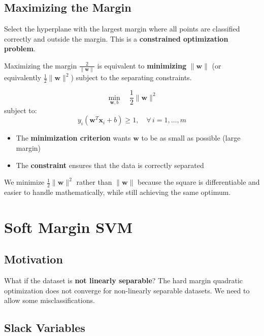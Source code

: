 \documentclass[11pt,a4paper]{article}
\theoremstyle{definition}
\theoremstyle{plain}
\theoremstyle{remark}
\begin{document}
\subsection{Maximizing the Margin}

Select the hyperplane with the largest margin where all points are classified correctly and outside the margin. This is a \textbf{constrained optimization problem}.

Maximizing the margin $\frac{2}{\|\mathbf{w}\|}$ is equivalent to \textbf{minimizing} $\|\mathbf{w}\|$ (or equivalently $\frac{1}{2}\|\mathbf{w}\|^2$) subject to the separating constraints.

\begin{tcolorbox}[colback=cyan!5!white,colframe=cyan!75!black,title=\textbf{Hard Margin SVM Formulation}]
\[
\min_{\mathbf{w}, b} \quad \frac{1}{2} \|\mathbf{w}\|^2
\]
subject to:
\[
y_i(\mathbf{w}^T \mathbf{x}_i + b) \geq 1, \quad \forall \, i = 1, \ldots, m
\]

\begin{itemize}
    \item The \textbf{minimization criterion} wants $\mathbf{w}$ to be as small as possible (large margin)
    \item The \textbf{constraint} ensures that the data is correctly separated
\end{itemize}

We minimize $\frac{1}{2}\|\mathbf{w}\|^2$ rather than $\|\mathbf{w}\|$ because the square is differentiable and easier to handle mathematically, while still achieving the same optimum.
\end{tcolorbox}


\section{Soft Margin SVM}

\subsection{Motivation}

What if the dataset is \textbf{not linearly separable}? The hard margin quadratic optimization does not converge for non-linearly separable datasets. We need to allow some misclassifications.

\subsection{Slack Variables}
\end{document}
